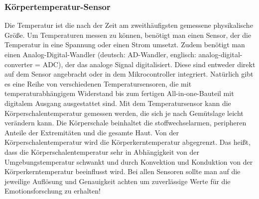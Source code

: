 \subsubsection{Körpertemperatur-Sensor} \label{grund-temp-subsubsec}


Die Temperatur ist die nach der Zeit am zweithäufigsten gemessene physikalische Größe.
Um Temperaturen messen zu können, benötigt man einen Sensor, der die Temperatur in eine
Spannung oder einen Strom umsetzt. Zudem benötigt man einen Analog-Digital-Wandler
(deutsch: AD-Wandler, englisch: analog-digital-converter = ADC), der das analoge Signal digitalisiert. Diese sind entweder direkt auf dem Sensor angebracht oder in dem Mikrocontroller
integriert. Natürlich gibt es eine Reihe von verschiedenen Temperatursensoren, die mit temperaturabhängigem Widerstand bis zum fertigen All-in-one-Bauteil mit digitalem Ausgang
ausgestattet sind. Mit dem Temperatursensor kann die Körperschalentemperatur gemessen werden, die sich je nach Gemütslage leicht verändern kann. Die Körperschale beinhaltet die stoffwechselarmen, peripheren Anteile der Extremitäten und die gesamte Haut. Von der Körperschalentemperatur wird die Körperkerntemperatur abgegrenzt. Das heißt, dass die Körperschalentemperatur sehr in Abhängigkeit von der Umgebungstemperatur schwankt und durch Konvektion und Konduktion von der Körperkerntemperatur beeinflusst wird.  Bei allen Sensoren sollte man auf die jeweilige Auflösung und Genauigkeit achten um zuverlässige Werte für die Emotionsforschung zu erhalten!